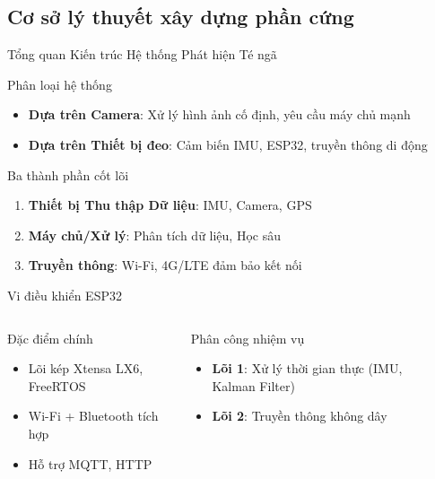 
\subsection{Cơ sở lý thuyết xây dựng phần cứng}

\begin{frame}{Tổng quan Kiến trúc Hệ thống Phát hiện Té ngã}
\begin{block}{Phân loại hệ thống}
\begin{itemize}
\item \textbf{Dựa trên Camera}: Xử lý hình ảnh cố định, yêu cầu máy chủ mạnh
\item \textbf{Dựa trên Thiết bị đeo}: Cảm biến IMU, ESP32, truyền thông di động
\end{itemize}
\end{block}

\begin{block}{Ba thành phần cốt lõi}
\begin{enumerate}
\item \textbf{Thiết bị Thu thập Dữ liệu}: IMU, Camera, GPS
\item \textbf{Máy chủ/Xử lý}: Phân tích dữ liệu, Học sâu
\item \textbf{Truyền thông}: Wi-Fi, 4G/LTE đảm bảo kết nối
\end{enumerate}
\end{block}
\end{frame}

\begin{frame}{Vi điều khiển ESP32}
\begin{columns}
\begin{block}{Đặc điểm chính}
\begin{itemize}
\item Lõi kép Xtensa LX6, FreeRTOS
\item Wi-Fi + Bluetooth tích hợp
\item Hỗ trợ MQTT, HTTP
\end{itemize}
\end{block}

\begin{block}{Phân công nhiệm vụ}
\begin{itemize}
\item \textbf{Lõi 1}: Xử lý thời gian thực (IMU, Kalman Filter)
\item \textbf{Lõi 2}: Truyền thông không dây
\end{itemize}
\end{block}

\begin{center}
\end{center}
\end{columns}
\end{frame}

